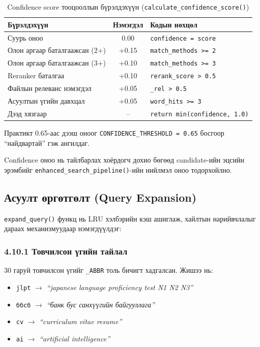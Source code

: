 \documentclass[11pt,a4paper]{article}
\newcommand{\fn}[1]{\nolinkurl{#1}}
\begin{document}
\begin{table}[H]
\centering
\caption[Confidence score тооцооллын бүрэлдэхүүн]{Confidence score тооцооллын бүрэлдэхүүн (\fn{calculate_confidence_score()})}
\label{tab:confidence_breakdown}
\small
\begin{tabularx}{\textwidth}{|X|c|X|}
\hline
\textbf{Бүрэлдэхүүн} & \textbf{Нэмэгдэл} & \textbf{Кодын нөхцөл} \\
\hline
Суурь оноо & 0.00 & \texttt{confidence = score} \\
\hline
Олон аргаар баталгаажсан (2+) & +0.15 & \texttt{match\_methods >= 2} \\
\hline
Олон аргаар баталгаажсан (3+) & +0.10 & \texttt{match\_methods >= 3} \\
\hline
Reranker баталгаа & +0.10 & \texttt{rerank\_score > 0.5} \\
\hline
Файлын релеванс нэмэгдэл & +0.05 & \texttt{\_rel > 0.5} \\
\hline
Асуултын үгийн давхцал & +0.05 & \texttt{word\_hits >= 3} \\
\hline
Дээд хязгаар & -- & \texttt{return min(confidence, 1.0)} \\
\hline
\end{tabularx}
\end{table}

Практикт 0.65-аас дээш оноог \texttt{CONFIDENCE\_THRESHOLD = 0.65} босгоор ``найдвартай'' гэж ангилдаг.

Confidence оноо нь тайлбарлах хоёрдогч дохио бөгөөд candidate-ийн эцсийн эрэмбийг \texttt{enhanced\_search\_pipeline()}-ийн нийлмэл оноо тодорхойлно.

\subsection{Асуулт өргөтгөлт (Query Expansion)}

\texttt{expand\_query()} функц нь LRU хэлбэрийн кэш ашиглаж, хайлтын нарийвчлалыг дараах механизмуудаар нэмэгдүүлдэг:

\subsubsection*{4.10.1 Товчилсон үгийн тайлал}

30 гаруй товчилсон үгийг \texttt{\_ABBR} толь бичигт хадгалсан. Жишээ нь:
\begin{itemize}
    \item \texttt{jlpt} $\rightarrow$ \textit{``japanese language proficiency test N1 N2 N3''}
    \item \texttt{ббсб} $\rightarrow$ \textit{``банк бус санхүүгийн байгууллага''}
    \item \texttt{cv} $\rightarrow$ \textit{``curriculum vitae resume''}
    \item \texttt{ai} $\rightarrow$ \textit{``artificial intelligence''}
\end{itemize}
\end{document}
